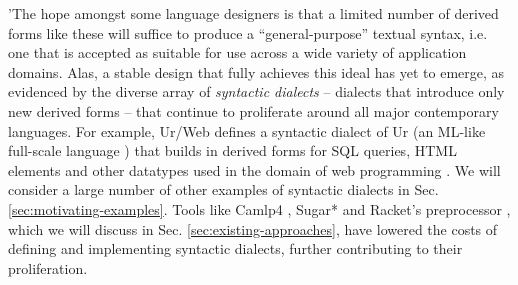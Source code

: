 'The hope amongst some language designers is that a limited number of derived forms like these will suffice to produce a ``general-purpose'' textual syntax, i.e. one that is accepted as suitable for use across a wide variety of application domains. Alas, a stable design that fully achieves this ideal has yet to emerge, as evidenced by the diverse array of \emph{syntactic dialects} -- dialects that introduce only new derived forms -- that continue to proliferate around all major contemporary languages. For example, Ur/Web defines a syntactic dialect of Ur (an ML-like full-scale language \cite{conf/pldi/Chlipala10}) that builds in derived forms for SQL queries, HTML elements and other datatypes used in the domain of web programming \cite{conf/popl/Chlipala15}. %
We will consider a large number of other examples of syntactic dialects in Sec. \ref{sec:motivating-examples}. 
Tools like Camlp4 \cite{ocaml-manual}, Sugar* \cite{erdweg2011sugarj,erdweg2013framework} and Racket's preprocessor \cite{Flatt:2012:CLR:2063176.2063195}, which we will discuss in Sec. \ref{sec:existing-approaches}, have lowered the costs of defining and implementing syntactic dialects, further contributing to their proliferation. 



